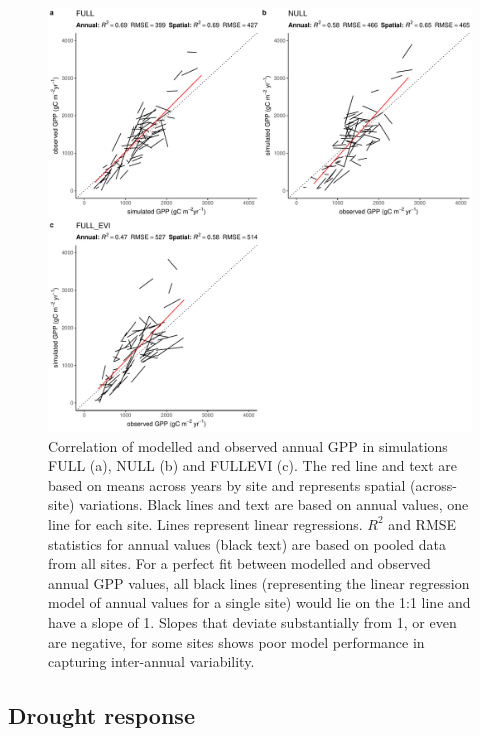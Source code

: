 \documentclass[gmd, manuscript]{copernicus}
\begin{document}
\begin{figure}[!ht]
    \includegraphics[width=\textwidth]{fig/modobs_spatial_annual.pdf}
    \caption{Correlation of modelled and observed annual GPP in simulations FULL (a), NULL (b) and FULL\textunderscore EVI (c). The red line and text are based on means across years by site and represents spatial (across-site) variations. Black lines and text are based on annual values, one line for each site. Lines represent linear regressions. $R^2$ and RMSE statistics for annual values (black text) are based on pooled data from all sites. For a perfect fit between modelled and observed annual GPP values, all black lines (representing the linear regression model of annual values for a single site) would lie on the 1:1 line and have a slope of 1. Slopes that deviate substantially from 1, or even are negative, for some sites shows poor model performance in capturing inter-annual variability.}
    \label{fig:modobs_spatialannual}
\end{figure}


\subsection{Drought response}
\label{sec:results_droughtresponse}
\end{document}
